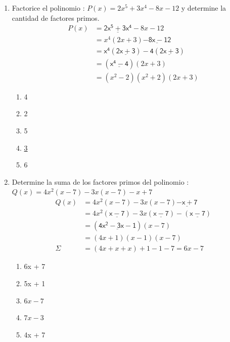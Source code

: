 \documentclass{article}
\begin{document}

\begin{enumerate}

\item{Factorice el polinomio : $P(x) = 2x^5 + 3x^4 - 8x - 12$ y determine la cantidad de factores primos.
\begin{align*}
P(x) & = \underline{\mathsf{2x^5 + 3x^4}} - 8x - 12 \\ %
& = x^4(2x + 3) \underline{\mathsf{- 8x - 12}} \\
& = \mathsf{x^4(\underline{2x + 3}) - 4(\underline{2x + 3})} \\
& = \mathsf{(\underline{x^4 - 4})}(2x + 3) \\
& = (x^2 - 2)(x^2 + 2)(2x + 3) 
\end{align*}
\begin{enumerate}
\item{4}
\item{2}
\item{5}
\item{\underline{3}}
\item{6}
\end{enumerate}
}

\item{Determine la suma de los factores primos del polinomio : \\ $Q(x) = 4x^2(x -7) - 3x(x-7) - x + 7$
\begin{align*}
Q(x) & = 4x^2(x -7) - 3x(x-7)\underline{\mathsf{ - x + 7}} \\
& = 4x^2(\underline{\mathsf{x -7}}) - 3x(\underline{\mathsf{x-7}}) - (\underline{\mathsf{x-7}}) \\
& = (\underline{\mathsf{4x^2 - 3x - 1}})(x - 7) \\
& = (4x + 1)(x - 1)(x - 7) \\
\Sigma & = (4x + x + x) + 1 - 1 - 7 = 6x - 7 
\end{align*}
\begin{enumerate}
\item{6x + 7}
\item{5x + 1}
\item{\underline{$6x - 7$}}
\item{$7x - 3$}
\item{4x + 7}
\end{enumerate}
}


\end{enumerate}
\end{document}
